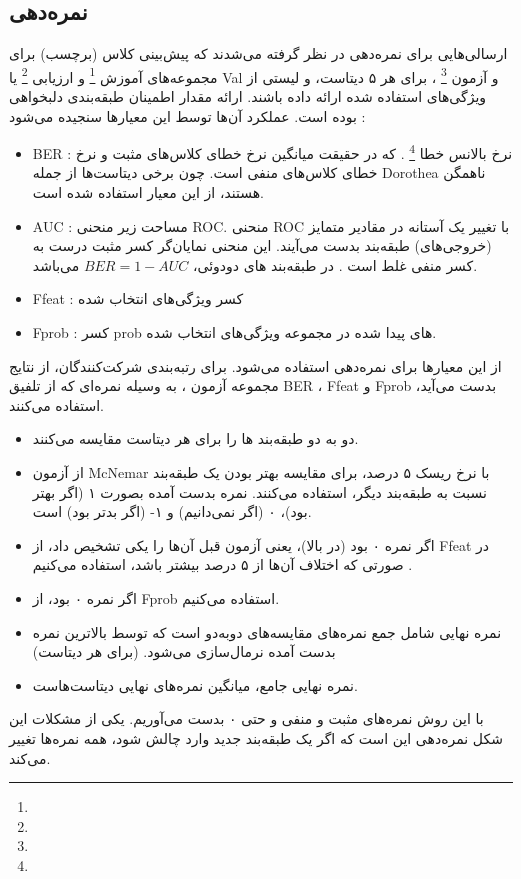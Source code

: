 \documentclass[a4paper, 12pt]{article}
\begin{document}
 \subsection*{نمره‌دهی}
 ارسالی‌هایی برای نمره‌دهی در نظر گرفته می‌شدند که پیش‌بینی کلاس (برچسب) برای 
 مجموعه‌های آموزش 
 \footnote{}
 و ارزیابی
 \footnote{}
 یا 
 Val
 و آزمون
 \footnote{}
  ، برای هر ۵ دیتاست، و لیستی از ویژگی‌های استفاده شده 
 ارائه داده باشند. ارائه مقدار اطمینان طبقه‌بندی دلبخواهی بوده است. عملکرد آن‌ها توسط این معیار‌ها سنجیده می‌شود :
 \begin{itemize}
 	\item
 	BER :
 	نرخ بالانس خطا
 	\footnote{}
 	.
 	که در حقیقت میانگین نرخ خطای کلاس‌های مثبت و نرخ خطای کلاس‌های منفی است. چون برخی دیتاست‌ها از جمله 
 	Dorothea
 	ناهمگن هستند، از این معیار استفاده شده است.
 	\item
 	AUC
 	:
 	مساحت زیر منحنی ROC. منحنی ROC با تغییر یک آستانه در مقادیر متمایز (خروجی‌های) طبقه‌بند بدست می‌آیند. این منحنی نمایان‌گر کسر مثبت درست به کسر منفی غلط است . در طبقه‌بند های دودوئی، 
 	$BER = 1 - AUC$
 	می‌باشد.
 	\item
 	Ffeat
 	:
 	کسر ویژگی‌های انتخاب شده
 	\item
 	Fprob
 	:
 	کسر prob ‌های پیدا شده در مجموعه ویژگی‌های انتخاب شده. 	
 \end{itemize}

از این معیار‌ها برای نمره‌دهی استفاده می‌شود. برای رتبه‌بندی شرکت‌کنندگان، از نتایج مجموعه آزمون  ، به وسیله نمره‌ای که از تلفیق 
BER
،
Ffeat
و
Fprob
بدست می‌آید، استفاده می‌کنند. 
\begin{itemize}
	\item 
	دو به دو طبقه‌بند ها را برای هر دیتاست مقایسه می‌کنند.
	\item
	از آزمون 
	McNemar
	با نرخ ریسک ۵ درصد، برای مقایسه  بهتر بودن یک طبقه‌بند نسبت به طبقه‌بند دیگر، استفاده می‌کنند. نمره بدست آمده بصورت ۱ (اگر بهتر بود)، ۰ (اگر نمی‌دانیم) و ۱- (اگر بدتر بود) است.
	\item
	اگر نمره ۰ بود (در بالا)، یعنی آزمون قبل آن‌ها را یکی تشخیص داد، از 
	Ffeat
	در صورتی که اختلاف آن‌ها از ۵ درصد بیشتر باشد، استفاده می‌کنیم
	.
	\item
	اگر نمره ۰ بود، از 
	Fprob
	استفاده می‌کنیم.
	\item
	نمره نهایی شامل جمع نمره‌های مقایسه‌های دوبه‌دو است که توسط بالا‌ترین نمره بدست آمده نرمال‌سازی می‌شود. (برای هر دیتاست)
	\item
	نمره نهایی جامع، میانگین نمره‌های نهایی دیتاست‌هاست. 
	
\end{itemize}
 با این روش نمره‌های مثبت و منفی و حتی ۰ بدست می‌آوریم. 
 یکی از مشکلات این شکل نمره‌دهی  این است که اگر یک طبقه‌بند جدید وارد چالش شود، همه نمره‌ها تغییر می‌کند. 
 
\end{document}
